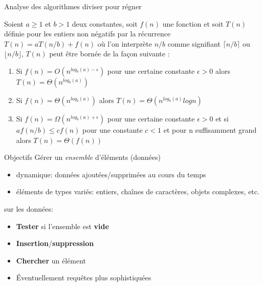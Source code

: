 \begin{frame}{Analyse des algorithmes diviser pour régner}
  \begin{theorem} 
Soient $a \geq 1$ et $b>1$  deux constantes, soit $f(n)$ une fonction et soit $T(n)$ définie pour les entiers non négatifs par la récurrence $T(n) = aT(n/b) + f(n)$ où l'on interprète $n/b$ comme signifiant $\lceil n/b \rceil$ ou $\lfloor n/b \rfloor$, $T(n)$ peut être bornée de la façon suivante  :  

\begin{enumerate}
  \item Si $f(n)=O(n^{log_b(a)-\epsilon})$ pour une certaine constante $\epsilon >0$  alors $T(n)=\Theta(n^{log_b(a)})$ \\
   \item Si $f(n)=\Theta(n^{log_b(a)})$  alors $T(n)=\Theta(n^{log_b(a)}logn)$ \\
   \item Si $f(n)=\Omega(n^{log_b(a)+\epsilon})$ pour une certaine constante $\epsilon > 0$ et si   $a f(n/b)\leq cf(n)$ pour une constante $c<1$ et pour n suffisamment grand alors $T(n)=\Theta(f(n))$
  \end{enumerate}  
\end{theorem}
\end{frame}




\begin{frame}{Objectifs}
  Gérer un \emph{ensemble} d'éléments (données)
  \begin{itemize}
  \item dynamique: données ajoutées/supprimées au cours du temps
  \item éléments de types variés: entiers, chaînes de caractères,
    objets complexes, etc.
  \end{itemize}
   sur les données:
  \begin{itemize}
  \item \textbf{Tester} si l'ensemble est \textbf{vide}
  \item \textbf{Insertion}/\textbf{suppression}
  \item \textbf{Chercher} un élément
  \item Éventuellement requêtes plus sophistiquées
  \end{itemize}
\end{frame}


